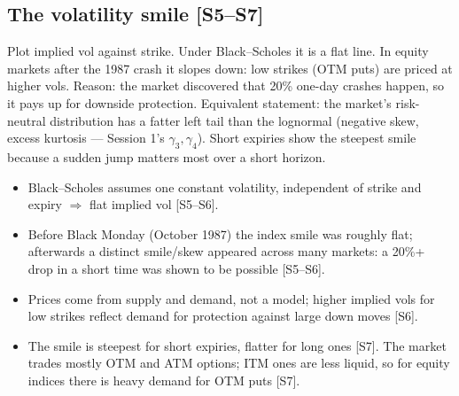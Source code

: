 \documentclass[10pt]{article}
\begin{document}
\subsection{The volatility smile [S5--S7]}
\begin{idea}
Plot implied vol against strike. Under Black--Scholes it is a flat line. In equity markets after the 1987 crash it slopes down: low strikes (OTM puts) are priced at higher vols. Reason: the market discovered that 20\% one-day crashes happen, so it pays up for downside protection. Equivalent statement: the market's risk-neutral distribution has a fatter left tail than the lognormal (negative skew, excess kurtosis --- Session 1's $\gamma_3,\gamma_4$). Short expiries show the steepest smile because a sudden jump matters most over a short horizon.
\end{idea}
\begin{itemize}
\item Black--Scholes assumes one constant volatility, independent of strike and expiry $\Rightarrow$ flat implied vol [S5--S6].
\item Before Black Monday (October 1987) the index smile was roughly flat; afterwards a distinct smile/skew appeared across many markets: a 20\%+ drop in a short time was shown to be possible [S5--S6].
\item Prices come from supply and demand, not a model; higher implied vols for low strikes reflect demand for protection against large down moves [S6].
\item The smile is steepest for short expiries, flatter for long ones [S7]. The market trades mostly OTM and ATM options; ITM ones are less liquid, so for equity indices there is heavy demand for OTM puts [S7].
\end{itemize}
\end{document}

